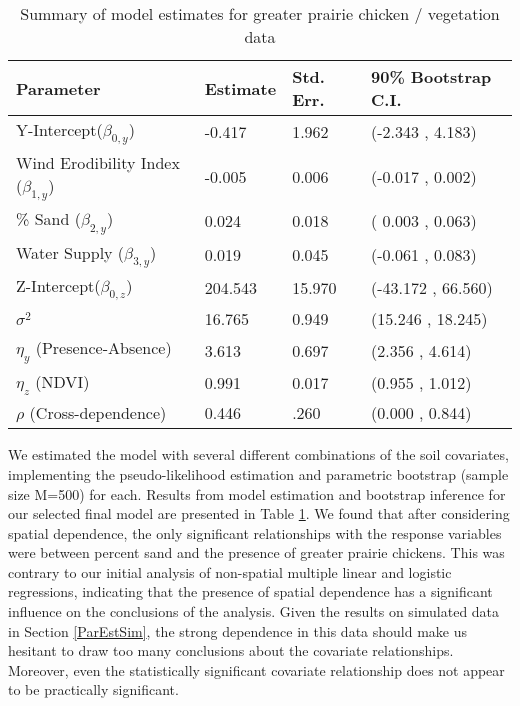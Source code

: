 \documentclass[12pt, a4paper, twoside]{article}
\begin{document}
\begin{table}
	\centering
\begin{tabular}{|l|l|l|l|}
	\hline
	\textbf{Parameter} & Estimate & Std. Err. & 90\% Bootstrap C.I.\\
	\hline
	Y-Intercept($\beta_{0,y}$) & -0.417 & 1.962 &(-2.343 ,  4.183) \\
		\hline
	Wind Erodibility Index ($\beta_{1,y}$) & -0.005 & 0.006 & (-0.017  , 0.002)\\
		\hline
	\% Sand ($\beta_{2,y}$) &  0.024 &  0.018 & ( 0.003 ,  0.063)\\
		\hline
	Water Supply ($\beta_{3,y}$) &  0.019 & 0.045 & (-0.061 ,  0.083)\\
		\hline
	Z-Intercept($\beta_{0,z}$) &  204.543 & 15.970 & (-43.172 , 66.560)\\
		\hline
	$\sigma^2$&  16.765 & 0.949 & (15.246 , 18.245) \\
		\hline
	$\eta_y$ (Presence-Absence)& 3.613 & 0.697 & (2.356 ,  4.614) \\
		\hline
	$\eta_z$ (NDVI)& 0.991 & 0.017 & (0.955 ,  1.012) \\
		\hline
	$\rho$ (Cross-dependence) & 0.446 & .260 & (0.000 , 0.844)\\
	\hline
\end{tabular}
\caption[Model summary for greater prairie chicken / vegetation data]{Summary of model estimates for greater prairie chicken / vegetation data }
\label{chickenResults}
\end{table}

We estimated the model with several different combinations of the soil covariates, implementing the pseudo-likelihood estimation and parametric bootstrap (sample size M=500) for each. Results from model estimation and bootstrap inference for our selected final model are presented in Table \ref{chickenResults}. We found that after considering spatial dependence, the only significant relationships with the response variables were between percent sand and the presence of greater prairie chickens. This was contrary to our initial analysis of non-spatial multiple linear and logistic regressions, indicating that the presence of spatial dependence has a significant influence on the conclusions of the analysis. Given the results on simulated data in Section \ref{ParEstSim}, the strong dependence in this data should make us hesitant to draw too many conclusions about the covariate relationships. Moreover, even the statistically significant covariate relationship does not appear to be practically significant.
\end{document}

